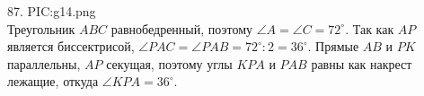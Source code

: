87. {{PIC:g14.png}}\\
Треугольник $ABC$ равнобедренный, поэтому $\angle A=\angle C =72^\circ.$ Так как $AP$ является биссектрисой, $\angle PAC=\angle PAB=72^\circ:2=36^\circ.$ Прямые $AB$ и $PK$ параллельны, $AP$ секущая, поэтому углы $KPA$ и $PAB$ равны как накрест лежащие, откуда $\angle KPA=36^\circ.$\\
